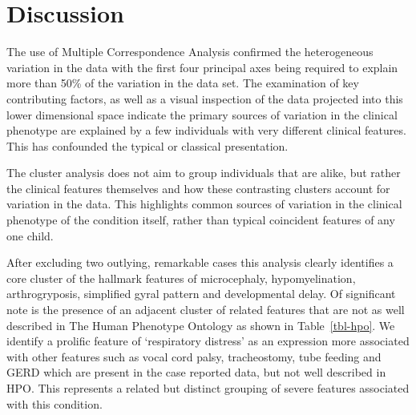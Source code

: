 \documentclass[
  authoryear,
  preprint,
  3p]{elsarticle}
\begin{document}
\hypertarget{discussion}{%
\section{Discussion}\label{discussion}}

The use of Multiple Correspondence Analysis confirmed the heterogeneous
variation in the data with the first four principal axes being required
to explain more than 50\% of the variation in the data set. The
examination of key contributing factors, as well as a visual inspection
of the data projected into this lower dimensional space indicate the
primary sources of variation in the clinical phenotype are explained by
a few individuals with very different clinical features. This has
confounded the typical or classical presentation.

The cluster analysis does not aim to group individuals that are alike,
but rather the clinical features themselves and how these contrasting
clusters account for variation in the data. This highlights common
sources of variation in the clinical phenotype of the condition itself,
rather than typical coincident features of any one child.

After excluding two outlying, remarkable cases this analysis clearly
identifies a core cluster of the hallmark features of microcephaly,
hypomyelination, arthrogryposis, simplified gyral pattern and
developmental delay. Of significant note is the presence of an adjacent
cluster of related features that are not as well described in The Human
Phenotype Ontology \citep{kohler2021human} as shown in
Table~\ref{tbl-hpo}. We identify a prolific feature of `respiratory
distress' as an expression more associated with other features such as
vocal cord palsy, tracheostomy, tube feeding and GERD which are present
in the case reported data, but not well described in HPO. This
represents a related but distinct grouping of severe features associated
with this condition.
\end{document}
